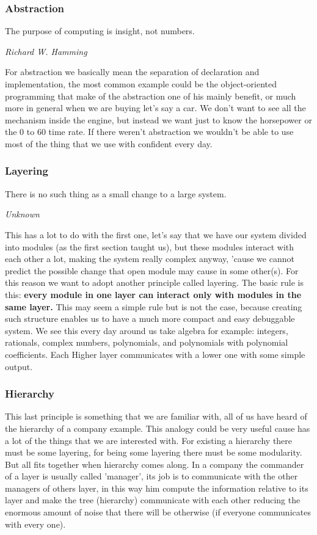 \documentclass{article}
\begin{document}
  \subsubsection{Abstraction}
    \epigraph{The purpose of computing is insight, not numbers.}{\textit{Richard W. Hamming}}
    For abstraction we basically mean the separation of declaration and implementation, 
    the most common example could be the object-oriented programming that make of the 
    abstraction one of his mainly benefit, or much more in general when we are buying let's
    say a car. We don't want to see all the mechanism inside the engine, but instead we want 
    just to know the horsepower or the 0 to 60 time rate. If there weren't abstraction we
    wouldn't be able to use most of the thing that we use with confident every day.
  \subsubsection{Layering}
    \epigraph{There is no such thing as a small change to a large system.}{\textit{Unknown}}
    This has a lot to do with the first one, let's say that we have our system divided into 
    modules (as the first section taught us), but these modules interact with each other a lot,
    making the system really complex anyway, 'cause we cannot predict the possible change that 
    open module may cause in some other(s). For this reason we want to adopt another principle 
    called layering. The basic rule is this: \textbf{every module in one layer can interact only
    with modules in the same layer.} This may seem a simple rule but is not the case, because 
    creating such structure enables us to have a much more compact and easy debuggable system.
    We see this every day around us take algebra for example:  integers, rationals, complex numbers, 
    polynomials, and polynomials with polynomial coefficients. Each Higher layer communicates with
    a lower one with some simple output.
  \subsubsection{Hierarchy}
    This last principle is something that we are familiar with, all of us have heard of the 
    hierarchy of a company example. This analogy could be very useful cause has a lot of the 
    things that we are interested with. For existing a hierarchy there must be some layering, 
    for being some layering there must be some modularity. But all fits together when 
    hierarchy comes along. In a company the commander of a layer is usually called 'manager', 
    its job is to communicate with the other managers of others layer, in this way him compute
    the information relative to its layer and make the tree (hierarchy) communicate with each other
    reducing the enormous amount of noise that there will be otherwise (if everyone communicates with
    every one).
\end{document}
